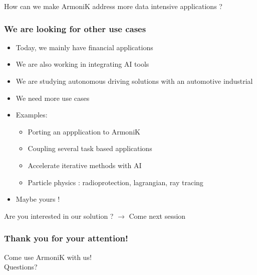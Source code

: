 \documentclass[10pt,aspectratio=1609]{beamer}
\begin{document}
\begin{section}{How can we make ArmoniK address more data intensive applications ?}
  \begin{frame}
    \frametitle{We are looking for other use cases}
    \begin{itemize}
      \item Today, we mainly have financial applications
      \item We are also working in integrating AI tools
      \item We are studying autonomous driving solutions with an automotive industrial
      \item We need more use cases
      \item Examples:
      \begin{itemize}
        \item Porting an appplication to ArmoniK
        \item Coupling several task based applications
        \item Accelerate iterative methods with AI
        \item Particle physics : radioprotection, lagrangian, ray tracing
      \end{itemize}
      \item Maybe yours !
    \end{itemize}
  \end{frame}

\end{section}

\begin{section}{Are you interested in our solution ? $\rightarrow$ Come next session}
  \begin{frame}
    \frametitle{Thank you for your attention!}

    Come use ArmoniK with us!
    \\
    Questions?
  \end{frame}
\end{section}
\end{document}
